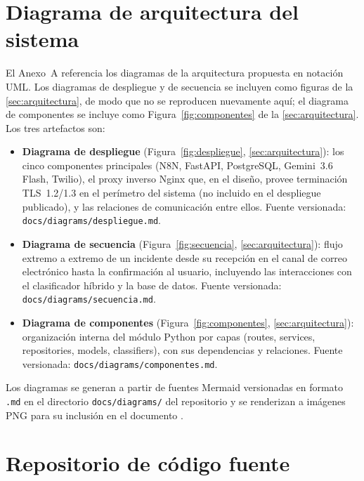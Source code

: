 
\section{Diagrama de arquitectura del sistema}\label{sec:anexo-diagrama-arquitectura}

El Anexo~A referencia los diagramas de la arquitectura propuesta en notación UML. Los diagramas de despliegue y de secuencia se incluyen como figuras de la \autoref{sec:arquitectura}, de modo que no se reproducen nuevamente aquí; el diagrama de componentes se incluye como Figura~\ref{fig:componentes} de la \autoref{sec:arquitectura}. Los tres artefactos son:

\begin{itemize}
  \item \textbf{Diagrama de despliegue} (Figura~\ref{fig:despliegue}, \autoref{sec:arquitectura}): los cinco componentes principales (N8N, FastAPI, PostgreSQL, Gemini~3.6 Flash, Twilio), el proxy inverso Nginx que, en el diseño, provee terminación TLS~1.2/1.3 en el perímetro del sistema (no incluido en el despliegue publicado), y las relaciones de comunicación entre ellos. Fuente versionada: \texttt{docs/diagrams/despliegue.md}.
  \item \textbf{Diagrama de secuencia} (Figura~\ref{fig:secuencia}, \autoref{sec:arquitectura}): flujo extremo a extremo de un incidente desde su recepción en el canal de correo electrónico hasta la confirmación al usuario, incluyendo las interacciones con el clasificador híbrido y la base de datos. Fuente versionada: \texttt{docs/diagrams/secuencia.md}.
  \item \textbf{Diagrama de componentes} (Figura~\ref{fig:componentes}, \autoref{sec:arquitectura}): organización interna del módulo Python por capas (routes, services, repositories, models, classifiers), con sus dependencias y relaciones. Fuente versionada: \texttt{docs/diagrams/componentes.md}.
\end{itemize}

Los diagramas se generan a partir de fuentes Mermaid versionadas en formato \texttt{.md} en el directorio \texttt{docs/diagrams/} del repositorio y se renderizan a imágenes PNG para su inclusión en el documento \parencite{Gomez2026_repositorio}.

\section{Repositorio de código fuente}\label{sec:anexo-repositorio}

